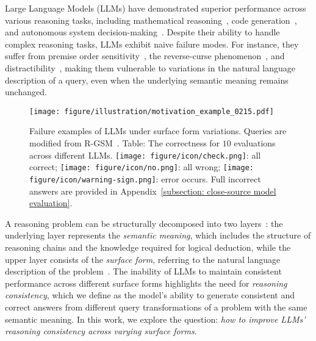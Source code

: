 Large Language Models (LLMs) have demonstrated superior performance across various reasoning tasks, including mathematical reasoning~\citep{YXLA2024-gsm1, qu2024recursive, lin2024rho, gou2023tora, shen2025satori}, code generation~\citep{chen2021evaluating, zhang2024diversity, zhang2023planning, dainese2024generating}, and autonomous system decision-making~\citep{yang2024agentoccam, sima2024drivelm}. Despite their ability to handle complex reasoning tasks, LLMs exhibit naive failure modes. For instance, they suffer from premise order sensitivity~\citep{chen2024premise, zhu2024dynamic}, the reverse-curse phenomenon~\citep{berglund2023reversal, golovneva2024reverse}, and distractibility~\citep{pmlr-v202-shi23a, zhu2024dyval}, making them vulnerable to variations in the natural language description of a query, even when the underlying semantic meaning remains unchanged.

\begin{figure*}[t]
    \centering
    \texttt{[image: figure/illustration/motivation\_example\_0215.pdf]}
    \caption{Failure examples of LLMs under surface form variations. Queries are modified from R-GSM~\citep{chen2024premise}. Table: The correctness for $10$ evaluations across different LLMs. \texttt{[image: figure/icon/check.png]}: all correct; \texttt{[image: figure/icon/no.png]}: all wrong; \texttt{[image: figure/icon/warning-sign.png]}: error occurs. Full incorrect answers are provided in Appendix~\ref{subsection: close-source model evaluation}.}
    \label{fig: motivation}
    \vspace{-4mm}
\end{figure*}


A reasoning problem can be structurally decomposed into two layers~\citep{zhu2023dyval, zhou2024paraphrase}: the underlying layer represents the \textit{semantic meaning}, which includes the structure of reasoning chains and the knowledge required for logical deduction, while the upper layer consists of the \textit{surface form}, referring to the natural language description of the problem~\citep{zhou2024paraphrase}. The inability of LLMs to maintain consistent performance across different surface forms highlights the need for \textit{reasoning consistency}, which we define as the model's ability to generate consistent and correct answers from different query transformations of a problem with the same semantic meaning. In this work, we explore the question: \textit{how to improve LLMs' reasoning consistency across varying surface forms}.


